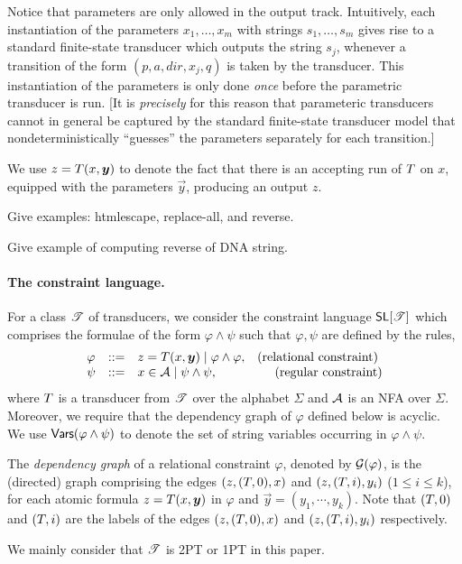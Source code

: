 Notice that parameters are only allowed in the output track.
Intuitively, each instantiation of the parameters $x_1,\ldots,x_m$ with strings 
$s_1,\ldots,s_m$ gives rise to a standard finite-state transducer which outputs
the string $s_j$, whenever a transition of the form $(p,a,dir,x_j,q)$ is
taken by the transducer. This instantiation of the parameters is only done 
\emph{once} before the parametric transducer is run. [It is \emph{precisely}
for this reason that parameteric transducers cannot in general be captured by 
the standard finite-state transducer model that nondeterministically ``guesses''
the parameters separately for each transition.]  

We use $z = \Transducer(x, \vec{y})$ to denote the fact that there is an accepting run of $T$ on $x$, equipped with the parameters $\vec{y}$, producing an output $z$.


Give examples: htmlescape, replace-all, and reverse.

Give example of computing reverse of DNA string.

\paragraph{The constraint language.}
For a class $\mathscr{T}$ of transducers, we consider the constraint language $\textsf{SL}[\mathscr{T}]$ which comprises the formulae of the form $\varphi \wedge \psi$ such that $\varphi,\psi$ are defined by the rules,
\[
\begin{array}{l l l r}
\varphi &::=& z = \Transducer(x, \vec{y}) \mid \varphi \wedge \varphi, &  \hfill  \mbox{(relational constraint) } \\ 
\psi &::= & x \in \Aut \mid \psi \wedge \psi, & \hfill \mbox{(regular constraint)} 
\end{array}
\]
where $T$ is a transducer from $\mathscr{T}$ over the alphabet $\Sigma$ and $\mathcal{A}$ is an NFA over $\Sigma$. Moreover, we require that the dependency graph of $\varphi$ defined below is acyclic. We use $\mathsf{Vars}(\varphi \wedge \psi)$ to denote the set of string variables occurring in $\varphi \wedge \psi$.

The \emph{dependency graph} of a relational constraint $\varphi$, denoted by $\mathcal{G}(\varphi)$, is the (directed) graph comprising the edges $(z, (T, 0), x)$ and $(z, (T, i), y_i)$ ($1\leq i\leq k$), for each atomic formula $z = \Transducer(x, \vec{y})$ in $\varphi$ and $\vec{y}=(y_1, \cdots, y_k)$. Note that $(T, 0)$ and $(T, i)$ are the labels of the edges $(z, (T, 0), x)$ and $(z, (T, i), y_i)$ respectively.
 
We mainly consider that $\mathscr{T}$ is 2PT or 1PT in this paper.
